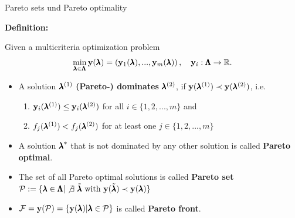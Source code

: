 \begin{frame}{Pareto sets und Pareto optimality}

\textbf{Definition:}

Given a multicriteria optimization problem
    $$\min_{\pmb{\lambda} \in \pmb{\Lambda}} \mathbf{y}(\pmb{\lambda}) = \left(\mathbf{y}_1(\pmb{\lambda}), ..., \mathbf{y}_m(\pmb{\lambda})\right), \quad \mathbf{y}_i: \pmb{\Lambda} \to \mathbb{R}.$$

\begin{itemize}
    \item A solution $\pmb{\lambda}^{(1)}$ \textbf{(Pareto-) dominates} $\pmb{\lambda}^{(2)}$, if $\mathbf{y}(\pmb{\lambda}^{(1)}) \prec \mathbf{y}(\pmb{\lambda}^{(2)})$, i.e.
\begin{enumerate}
    \item $\mathbf{y}_i(\pmb{\lambda}^{(1)}) \le \mathbf{y}_i(\pmb{\lambda}^{(2)})$ for all $i \in \{1, 2, ..., m\}$ and
    \item $f_j(\pmb{\lambda}^{(1)}) < f_j(\pmb{\lambda}^{(2)})$ for at least one $j \in \{1, 2, ..., m\}$
\end{enumerate}
\vspace*{0.1cm}
\item A solution ${\pmb{\lambda}}^*$ that is not dominated by any other solution is called \textbf{Pareto optimal}.
\vspace*{0.1cm}
\item The set of all Pareto optimal solutions is called \textbf{Pareto set} $\mathcal{P} := \{\pmb{\lambda} \in \pmb{\Lambda} |\not \exists ~\tilde{\pmb{\lambda}} \text{ with } \mathbf{y}(\tilde{\pmb{\lambda}}) \prec \mathbf{y}(\pmb{\lambda})\}$
\item $\mathcal{F} = \mathbf{y}(\mathcal{P}) = \{\mathbf{y}(\pmb{\lambda}) | \pmb{\lambda} \in \mathcal{P}\}$ is called \textbf{Pareto front}.
\end{itemize}

\end{frame}


